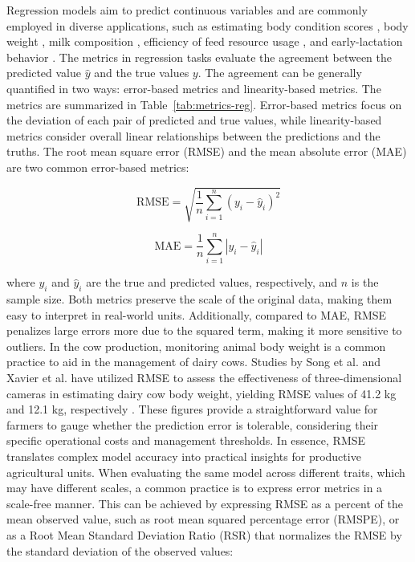 Regression models aim to predict continuous variables and are commonly employed in diverse applications, such as estimating body condition scores \citep{spoliansky_development_2016, yukun_automatic_2019}, body weight \citep{song_automated_2018,xavier_use_2022}, milk composition \citep{rovere_prediction_2021,mota_real-time_2022,mantysaari_body_2019,frizzarin_predicting_2021}, efficiency of feed resource usage \citep{grelet_potential_2020, appuhamy_prediction_2016,de_souza_predicting_2018}, and early-lactation behavior \citep{van_dixhoorn_indicators_2018}. The metrics in regression tasks evaluate the agreement between the predicted value $\hat{y}$ and the true values $y$. The agreement can be generally quantified in two ways: error-based metrics and linearity-based metrics. The metrics are summarized in Table~\ref{tab:metrics-reg}. Error-based metrics focus on the deviation of each pair of predicted and true values, while linearity-based metrics consider overall linear relationships between the predictions and the truths. The root mean square error (RMSE) and the mean absolute error (MAE) are two common error-based metrics:

\begin{equation} \label{eq_rmse}
\text{RMSE} = \sqrt{\frac{1}{n} \sum_{i=1}^{n} (y_i - \hat{y}_i)^2}
\end{equation}

\begin{equation} \label{eq_mae}
    \text{MAE} = \frac{1}{n} \sum_{i=1}^{n} |y_i - \hat{y}_i|
\end{equation}

where $y_i$ and $\hat{y}_i$ are the true and predicted values, respectively, and $n$ is the sample size. Both metrics preserve the scale of the original data, making them easy to interpret in real-world units. Additionally, compared to MAE, RMSE penalizes large errors more due to the squared term, making it more sensitive to outliers. In the cow production, monitoring animal body weight is a common practice to aid in the management of dairy cows. Studies by Song et al. and Xavier et al. have utilized RMSE to assess the effectiveness of three-dimensional cameras in estimating dairy cow body weight, yielding RMSE values of 41.2 kg and 12.1 kg, respectively \citep{song_automated_2018,xavier_use_2022}. These figures provide a straightforward value for farmers to gauge whether the prediction error is tolerable, considering their specific operational costs and management thresholds. In essence, RMSE translates complex model accuracy into practical insights for productive agricultural units.
When evaluating the same model across different traits, which may have different scales, a common practice is to express error metrics in a scale-free manner. This can be achieved by expressing RMSE as a percent of the mean observed value, such as root mean squared percentage error (RMSPE), or as a Root Mean Standard Deviation Ratio (RSR) that normalizes the RMSE by the standard deviation of the observed values:

